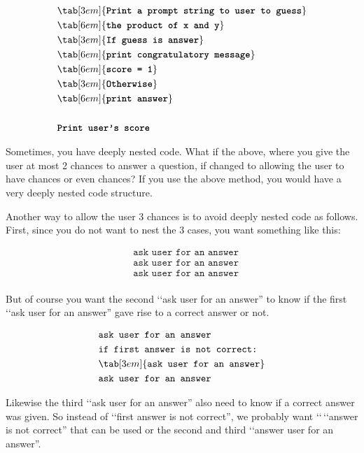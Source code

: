 \begin{align*}
& \tab[3em]{\texttt{\textbf{Print a prompt string to user to guess}}}\\
& \tab[6em]{\texttt{\textbf{the product of x and y}}}\\
& \tab[3em]{\texttt{\textbf{If guess is answer}}}\\
& \tab[6em]{\texttt{\textbf{print congratulatory message}}}\\
& \tab[6em]{\texttt{\textbf{score = 1}}}\\
& \tab[3em]{\texttt{\textbf{Otherwise}}}\\
& \tab[6em]{\texttt{\textbf{print answer}}}\\\\
& \texttt{\textbf{Print user's score}}\\
\end{align*}

Sometimes, you have deeply nested code. What if the above, where you
give the user at most 2 chances to answer a question, if changed to
allowing the user to have  chances or even  chances?
If you use the above method, you would have a very deeply nested code
structure.

Another way to allow the user 3 chances is to avoid deeply nested code
as follows. First, since you do not want to nest the 3 cases, you want
something like this:

\begin{align*}
&\texttt{ask user for an answer}\\
&\texttt{ask user for an answer}\\
&\texttt{ask user for an answer}\\
\end{align*}

But of course you want the second \lq\lq ask user for an answer'' to know if
the first \lq\lq ask user for an answer'' gave rise to a correct answer or
not.

\begin{align*}
&\texttt{ask user for an answer}\\
&\texttt{if first answer is not correct:}\\
&\tab[3em]{\texttt{ask user for an answer}}\\
&\texttt{ask user for an answer}\\
\end{align*}

Likewise the third \lq\lq ask user for an answer'' also need to know if a
correct answer was given. So instead of \lq\lq first answer is not correct'',
we probably want \lq\lq \,\lq\lq answer is not correct'' that can be used or the second and third \lq\lq answer user for an answer''.

